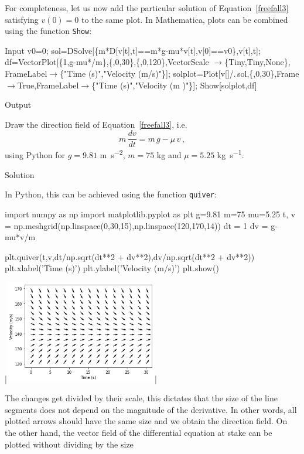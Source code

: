 \begin{example}
For completeness, let us now add the particular solution of Equation~\eqref{freefall3} satisfying $v(0)=0$ to the same plot. In Mathematica, plots can be combined using the function \lstinline{Show}:
\begin{mdframed}[default,backgroundcolor=gray!40,roundcorner=8pt]
\begin{mmaCell}[moredefined={ m, g, mu, VectorScale, Tiny, df}]{Input}
  v0=0;
	 sol=DSolve[\{m*D[v[t],t]==m*g-mu*v[t],v[0]==v0\},v[t],t];
	 df=VectorPlot[\{1,g-mu*/m\},\{,0,30\},\{,0,120\},VectorScale \(\pmb{\to}\)\{Tiny,Tiny,None\},
	 FrameLabel\(\pmb{\to}\)\{"Time (s)","Velocity (m/s)"\}];
	 solplot=Plot[v[]/.\(\pmb{\,}\)sol,\{,0,30\},Frame\(\pmb{\to}\)True,FrameLabel\(\pmb{\to}\)\{"Time (s)","Velocity (m )"\}];
	 Show[solplot,df]
\end{mmaCell}

\begin{mmaCell}[moregraphics={moreig={scale=.7}}]{Output}
\end{mmaCell}
\end{mdframed}
\fi

\ifpython
\label{exDF}
Draw the direction field of Equation~\eqref{freefall3}, i.e.
$$
m\,\dfrac{d v}{d t}=m\,g-\mu\,v\,,
$$
using Python for $g=9.81$ \si{m.s^{-2}}, $m=75$ \si{kg} and $\mu=5.25$ \si{kg.s^{-1}}.

Solution 

In Python, this can be achieved using the function \lstinline{quiver}:
\begin{pyin}
import numpy as np
import matplotlib.pyplot as plt
g=9.81
m=75
mu=5.25
t, v = np.meshgrid(np.linspace(0,30,15),np.linspace(120,170,14))
dt = 1
dv = g-mu*v/m

plt.quiver(t,v,dt/np.sqrt(dt**2 + dv**2),dv/np.sqrt(dt**2 + dv**2))
plt.xlabel('Time (s)')
plt.ylabel('Velocity (m/s)')
plt.show()
\end{pyin}
\begin{pyout}
|\includegraphics[width=0.5\textwidth]{FreeFall_DF_Python.png}|
\end{pyout}
The changes get divided by their scale, this dictates that the size of the line segments does not depend on the magnitude of the derivative. In other words, all plotted arrows should have the same size and we obtain the direction field. On the other hand, the vector field of the differential equation at stake can be plotted without dividing by the size


\end{example}

